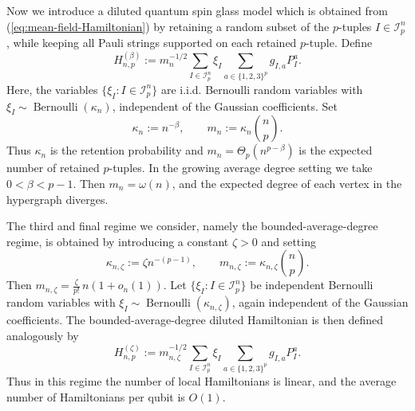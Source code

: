 \documentclass[12pt]{article}
\newcommand{\mcI}{\mathcal{I}}
\begin{document}
Now we introduce a diluted quantum spin glass model which is obtained from
(\ref{eq:mean-field-Hamiltonian}) by
retaining a random subset of the $p$-tuples \(I\in\mcI_p^n\), while keeping all Pauli strings supported on each retained $p$-tuple. Define 
\begin{equation}
\label{eq:sparseHamiltonian}
    H_{n,p}^{(\beta)}
    :=
    m_n^{-1/2}
    \sum_{I\in\mcI_p^n}
    \xi_I
    \sum_{a\in\{1,2,3\}^p}
    g_{I,a}P_I^a .
\end{equation}
Here, the variables \(\{\xi_I:I\in\mcI_p^n\}\) are i.i.d. Bernoulli random
variables with \(\xi_I\sim\operatorname{Bernoulli}(\kappa_n)\), independent of
the Gaussian coefficients. Set
\[
    \kappa_n:=n^{-\beta},
    \qquad
    m_n:=\kappa_n\binom np.
\]
Thus \(\kappa_n\) is the retention probability and $m_n=\Theta_p(n^{p-\beta})$ is the expected number of retained $p$-tuples.
In the growing average degree setting we take
 \(0< \beta<p-1\). Then $m_n=\omega(n)$, and the expected degree of each vertex in the hypergraph diverges.
 
 The third and final regime we consider, namely the 
 bounded-average-degree regime, 
 is obtained by introducing a constant \(\zeta>0\) and setting
\[
    \kappa_{n,\zeta}:=\zeta n^{-(p-1)},
    \qquad
    m_{n,\zeta}:=\kappa_{n,\zeta}\binom np .
\]
Then $m_{n,\zeta} =\frac{\zeta}{p!}\,n(1+o_n(1))$.
Let \(\{\xi_I:I\in\mcI_p^n\}\) be independent Bernoulli random
variables with
\(\xi_I\sim\operatorname{Bernoulli}(\kappa_{n,\zeta})\), again independent of
the Gaussian coefficients. The bounded-average-degree diluted Hamiltonian is then defined analogously by
\begin{equation}
\label{eq:zetaHamiltonian}
    H_{n,p}^{(\zeta)}
    :=
    m_{n,\zeta}^{-1/2}
    \sum_{I\in\mcI_p^n}
    \xi_I
    \sum_{a\in\{1,2,3\}^p}
    g_{I,a}P_I^a .
\end{equation}
Thus in this regime the number of local
Hamiltonians is linear, and the average number of Hamiltonians per qubit is $O(1)$.
\end{document}
